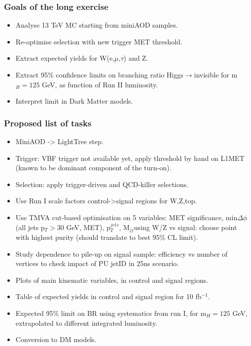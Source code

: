\documentclass[red,compress,xcolor=table]{beamer}
\begin{document}
\begin{frame}
\begin{columns}
\end{columns}

\end{frame}

\begin{frame}
\frametitle{Goals of the long exercise}

\begin{itemize}
\item \scriptsize Analyse 13 TeV MC starting from miniAOD samples.
\item \scriptsize Re-optimise selection with new trigger MET threshold. 
\item \scriptsize Extract expected yields for W(e,$\mu$,$\tau$) and Z.
\item \scriptsize Extract 95\% confidence limits on branching ratio Higgs$\rightarrow$invisible for m$_H=125$ GeV, as function of Run II luminosity.
\item \scriptsize Interpret limit in Dark Matter models.
\end{itemize}

\end{frame}

\begin{frame}
\frametitle{Proposed list of tasks}

\begin{itemize}
\item \scriptsize MiniAOD -> LightTree step.
\item \scriptsize Trigger: VBF trigger not available yet, apply threshold by hand on L1MET (known to be dominant component of the turn-on).
\item \scriptsize Selection: apply trigger-driven and QCD-killer selections.
\item \scriptsize Use Run I scale factors control->signal regions for W,Z,top.
\item \scriptsize Use TMVA cut-based optimisation on 5 variables: MET significance, min$\Delta\phi$(all jets p$_T>30$ GeV, MET), p$_T^{jets}$, M$_{jj}$using W/Z vs signal: choose point with highest purity (should translate to best 95\% CL limit).
\item \scriptsize Study dependence to pile-up on signal sample: efficiency vs number of vertices to check impact of PU jetID in 25ns scenario.
\item \scriptsize Plots of main kinematic variables, in control and signal regions.
\item \scriptsize Table of expected yields in control and signal region for 10 fb$^{-1}$.
\item \scriptsize Expected 95\% limit on BR using systematics from run I, for m$_H=125$ GeV, extrapolated to different integrated luminosity.
\item \scriptsize Conversion to DM models.
\end{itemize}

\end{frame}
\end{document}
